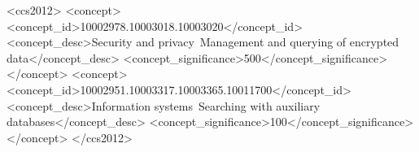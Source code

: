 \documentclass[sigconf,pdftex]{acmart}
\begin{document}


\begin{CCSXML}
<ccs2012>
<concept>
<concept_id>10002978.10003018.10003020</concept_id>
<concept_desc>Security and privacy~Management and querying of encrypted data</concept_desc>
<concept_significance>500</concept_significance>
</concept>
<concept>
<concept_id>10002951.10003317.10003365.10011700</concept_id>
<concept_desc>Information systems~Searching with auxiliary databases</concept_desc>
<concept_significance>100</concept_significance>
</concept>
</ccs2012>
\end{CCSXML}


\end{document}
